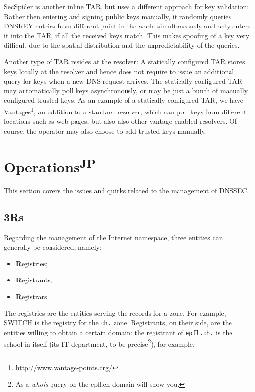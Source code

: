 \documentclass[a4paper,twocolumn]{scrartcl}
\newcommand{\wbjp}{\textsuperscript{JP}}
\begin{document}
SecSpider \cite{secspider, Osterweil09} is another inline TAR, but
uses a different approach for key validation: Rather then entering and
signing public keys manually, it randomly queries DNSKEY entries from
different point in the world simultaneously and only enters it into
the TAR, if all the received keys match. This makes spoofing of a key
very difficult due to the spatial distribution and the
unpredictability of the queries.

Another type of TAR resides at the resolver: A statically configured
TAR stores keys locally at the resolver and hence does not require to issue an
additional query for keys when a new DNS request arrives. The
statically configured TAR may automatically poll keys asynchronously,
or may be just a bunch of manually configured trusted keys. As an
example of a statically configured TAR, we have
Vantages\footnote{\url{http://www.vantage-points.org/}}, an addition
to a standard resolver, \cite{Osterweil09} which can poll keys from
different locations such as web pages, but also also other
vantage-enabled resolvers. Of course, the operator may also choose to
add trusted keys manually.

\section{Operations\wbjp}
This section covers the issues and quirks related to the management of DNSSEC.
\subsection{3Rs}
Regarding the management of the Internet namespace, three entities can generally be considered, namely:
\begin{itemize}
\item \textbf{R}egistries;
\item \textbf{R}egistrants;
\item \textbf{R}egistrars.
\end{itemize}

The registries are the entities serving the records for a zone. For example, SWITCH is the registry for the \verb|ch.| zone. Registrants, on their side, are the entities willing to obtain a certain domain: the registrant of \verb|epfl.ch.| is the school in itself (its IT-department, to be precise\footnote{As a \emph{whois} query on the epfl.ch domain will show you.}), for example.
\end{document}
